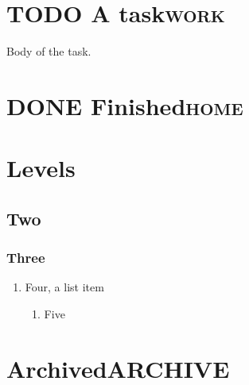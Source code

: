 \section{{\bfseries\sffamily TODO} A task\hfill{}\textsc{work}}
\label{sec:org7bfd295}
Body of the task.
\section{{\bfseries\sffamily DONE} Finished\hfill{}\textsc{home}}
\label{sec:org1c59b52}
\section{Levels}
\label{sec:org3028fdc}
\subsection{Two}
\label{sec:org0e4d337}
\subsubsection{Three}
\label{sec:org1f85fd9}
\begin{enumerate}
\item Four, a list item
\label{sec:org47118c0}
\begin{enumerate}
\item Five
\label{sec:orgaf3ed89}
\end{enumerate}
\end{enumerate}
\section{Archived\hfill{}\textsc{ARCHIVE}}
\label{sec:org0af2b60}
